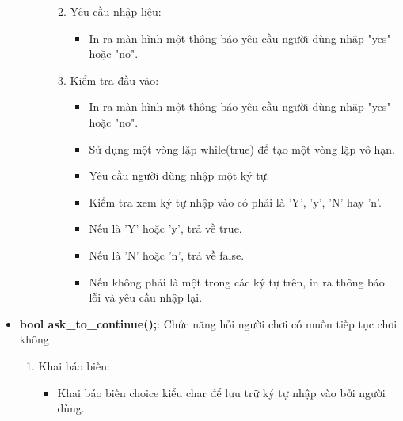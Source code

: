 \documentclass{article}
\begin{document}
\begin{itemize}
\begin{description}
\begin{enumerate}
\begin{itemize}
                \end{itemize}
            \item Yêu cầu nhập liệu:
                \begin{itemize}
                    \item In ra màn hình một thông báo yêu cầu người dùng nhập "yes" hoặc "no".
                \end{itemize}
            \item Kiểm tra đầu vào:
                \begin{itemize}
                    \item In ra màn hình một thông báo yêu cầu người dùng nhập "yes" hoặc "no".
                    \item Sử dụng một vòng lặp while(true) để tạo một vòng lặp vô hạn.
                    \item Yêu cầu người dùng nhập một ký tự.
                    \item Kiểm tra xem ký tự nhập vào có phải là 'Y', 'y', 'N' hay 'n'.
                    \item Nếu là 'Y' hoặc 'y', trả về true.
                    \item Nếu là 'N' hoặc 'n', trả về false.
                    \item Nếu không phải là một trong các ký tự trên, in ra thông báo lỗi và yêu cầu nhập lại.
                \end{itemize} 
        \end{enumerate}
    \end{description}
    
    \item \textbf{bool ask\_to\_continue();}: Chức năng hỏi người chơi có muốn tiếp tục chơi không
    \begin{description}
            \begin{enumerate}
            \item Khai báo biến:
                \begin{itemize}
                    \item Khai báo biến choice kiểu char để lưu trữ ký tự nhập vào bởi người dùng.


\end{itemize}
\end{enumerate}
\end{description}
\end{itemize}
\end{document}
